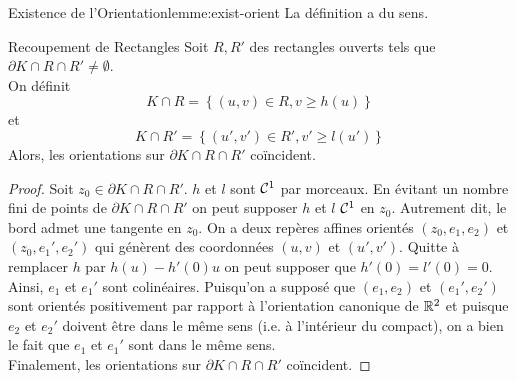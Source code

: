 \documentclass{cours}
\begin{document}
\begin{lemme}{Existence de l'Orientation}{lemme:exist-orient}
	La définition a du sens.
\end{lemme}
\begin{lemme}{Recoupement de Rectangles}{}
	Soit $R, R'$ des rectangles ouverts tels que $\partial K \cap R \cap R' \neq \emptyset$.\\
	On définit 
	\begin{equation*}
		K \cap R = \left\{\left(u, v\right) \in R, v\geq h\left(u\right)\right\}
	\end{equation*}
	et 
	\begin{equation*}
		K \cap R' = \left\{\left(u', v'\right)\in R', v' \geq l\left(u'\right)\right\}
	\end{equation*}
	Alors, les orientations sur $\partial K \cap R \cap R'$ coïncident.
\end{lemme}
\begin{proof}
	Soit $z_{0}  \in \partial K \cap R \cap R'$. $h$ et $l$ sont $\mathcal{C}^{1}$ par morceaux. 
	En évitant un nombre fini de points de $\partial K \cap R\cap R'$ on peut supposer $h$ et $l$ $\mathcal{C}^{1}$ en $z_{0}$. 
	Autrement dit, le bord admet une tangente en $z_{0}$. On a deux repères affines orientés $\left(z_{0}, e_{1}, e_{2}\right)$ et $\left(z_{0}, e_{1}', e_{2}'\right)$ qui génèrent des coordonnées $\left(u, v\right)$ et $\left(u', v'\right)$.
	Quitte à remplacer $h$ par $h\left(u\right) - h'\left(0\right)u$ on peut supposer que $h'\left(0\right) = l'\left(0\right) = 0$. \\
	Ainsi, $e_{1}$ et $e_{1}'$ sont colinéaires. Puisqu'on a supposé que $\left(e_{1}, e_{2}\right)$ et $\left(e_{1}', e_{2}'\right)$ sont orientés positivement par rapport à l'orientation canonique de $\mathbb{R}^{2}$ et puisque $e_{2}$ et $e_{2}'$ doivent être dans le même sens (i.e. à l'intérieur du compact), on a bien le fait que $e_{1}$ et $e_{1}'$ sont dans le même sens.\\
	Finalement, les orientations sur $\partial K \cap R \cap R'$ coïncident. 
\end{proof}
\end{document}
